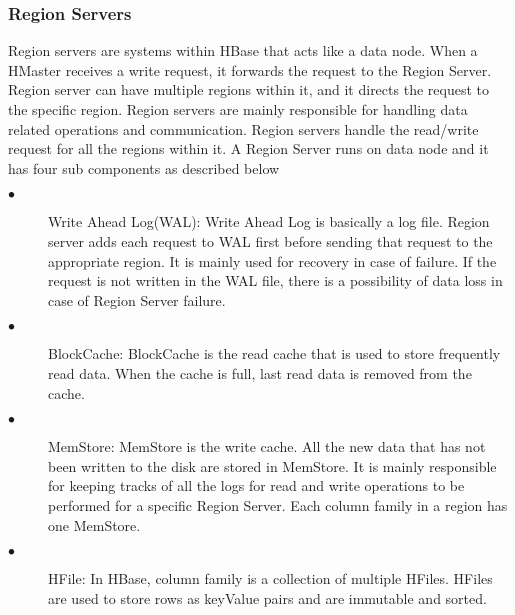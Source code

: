 \documentclass[11pt,a4paper,bibtotoc,idxtotoc,headsepline,footsepline,footexclude,BCOR12mm,DIV13]{scrbook}
\begin{document}
\subsubsection{Region Servers}
\label{region serves}
Region servers are systems within HBase that acts like a data node\cite{hbase:insights}. When a HMaster receives a write request, it forwards the request to the Region Server. Region server can have multiple regions within it, and it directs the request to the specific region. Region servers are mainly responsible for handling data related operations and communication. Region servers handle the read/write request for all the regions within it. 
A Region Server runs on data node and it has four sub components as described below\cite{hbase:architecture}
\begin{description}
	\item[$\bullet$]  Write Ahead Log(WAL): Write Ahead Log is basically a log file. Region server adds each request to WAL first before sending that request to the appropriate region. It is mainly used for recovery in case of failure\cite{hbase:insights}. If the request is not written in the WAL file, there is a possibility of data loss in case of Region Server failure.
\end{description}

\begin{description}
	\item[$\bullet$]  BlockCache: BlockCache is the read cache that is used to store frequently read data\cite{hbase:insights}. When the cache is full, last read data is removed from the cache.
\end{description}

\begin{description}
	\item[$\bullet$] MemStore: MemStore is the write cache. All the new data that has not been written to the disk are stored in MemStore. It is mainly responsible for keeping tracks of all the logs for read and write operations to be performed for a specific Region Server\cite{hbase:architecture}. Each column family in a region has one MemStore\cite{hbase:insights}.
\end{description}

\begin{description}
	\item[$\bullet$] HFile: In HBase, column family is a collection of multiple HFiles. HFiles are used to store rows as keyValue pairs and are immutable and sorted\cite{hbase:insights}.
\end{description}
\end{document}
